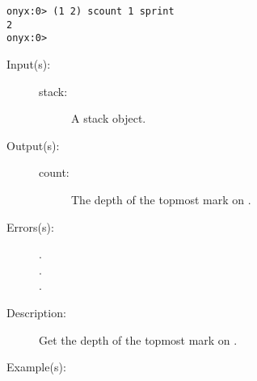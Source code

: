 \begin{description}
\begin{description}
\begin{verbatim}
onyx:0> (1 2) scount 1 sprint
2
onyx:0>
		\end{verbatim}
	\end{description}
\label{systemdict:scounttomark}
\item[{\onyxop{stack}{scounttomark}{count}}: ]
	\begin{description}\item[]
	\item[Input(s): ]
		\begin{description}\item[]
		\item[stack: ]
			A stack object.
		\end{description}
	\item[Output(s): ]
		\begin{description}\item[]
		\item[count: ]
			The depth of the topmost mark on .
		\end{description}
	\item[Errors(s): ]
		\begin{description}\item[]
		\item[.]
		\item[.]
		\item[.]
		\end{description}
	\item[Description: ]
		Get the depth of the topmost mark on .
	\item[Example(s): ]\begin{verbatim}


\end{verbatim}
\end{description}
\end{description}
